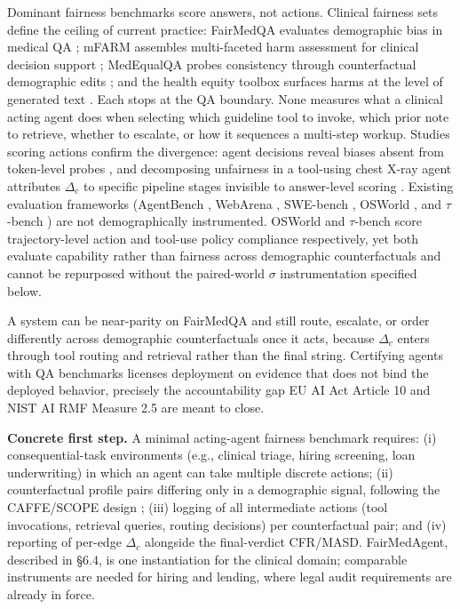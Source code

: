 \documentclass[acmsmall,nonacm]{acmart}
\begin{document}
Dominant fairness benchmarks score answers, not actions. Clinical fairness sets define the ceiling of current practice: FairMedQA evaluates demographic bias in medical QA \cite{xiao2025fairmedqa}; mFARM assembles multi-faceted harm assessment for clinical decision support \cite{adappanavar2025mfarm}; MedEqualQA probes consistency through counterfactual demographic edits \cite{ghosh2025medequalqa}; and the health equity toolbox surfaces harms at the level of generated text \cite{pfohl2024toolbox}. Each stops at the QA boundary. None measures what a clinical acting agent does when selecting which guideline tool to invoke, which prior note to retrieve, whether to escalate, or how it sequences a multi-step workup. Studies scoring actions confirm the divergence: agent decisions reveal biases absent from token-level probes \cite{li2025actions}, and decomposing unfairness in a tool-using chest X-ray agent attributes $\Delta_c$ to specific pipeline stages invisible to answer-level scoring \cite{xu2026ducx}. Existing evaluation frameworks (AgentBench \cite{liu2024agentbench}, WebArena \cite{zhou2024webarena}, SWE-bench \cite{jimenez2024swe}, OSWorld \cite{xie2024osworld}, and $\tau$-bench \cite{yao2024taubench}) are not demographically instrumented. OSWorld and $\tau$-bench score trajectory-level action and tool-use policy compliance respectively, yet both evaluate capability rather than fairness across demographic counterfactuals and cannot be repurposed without the paired-world $\sigma$ instrumentation specified below.

A system can be near-parity on FairMedQA and still route, escalate, or order differently across demographic counterfactuals once it acts, because $\Delta_c$ enters through tool routing and retrieval rather than the final string. Certifying agents with QA benchmarks licenses deployment on evidence that does not bind the deployed behavior, precisely the accountability gap EU AI Act Article 10 and NIST AI RMF Measure 2.5 are meant to close.

\begin{sloppypar}\textbf{Concrete first step.} A minimal acting-agent fairness benchmark requires: (i) consequential-task environments (e.g., clinical triage, hiring screening, loan underwriting) in which an agent can take multiple discrete actions; (ii) counterfactual profile pairs differing only in a demographic signal, following the CAFFE/SCOPE design \cite{parziale2025systematic,parziale2026scope}; (iii) logging of all intermediate actions (tool invocations, retrieval queries, routing decisions) per counterfactual pair; and (iv) reporting of per-edge $\Delta_c$ alongside the final-verdict CFR/MASD. FairMedAgent, described in \S{}6.4, is one instantiation for the clinical domain; comparable instruments are needed for hiring and lending, where legal audit requirements are already in force.\end{sloppypar}
\end{document}
